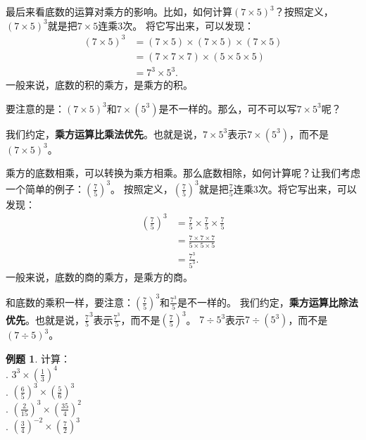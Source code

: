 \documentclass[12pt,UTF8]{ctexbook}
\theoremstyle{definition}
\newtheorem{et}{例题}[section]
\theoremstyle{plain}
\begin{document}
最后来看底数的运算对乘方的影响。比如，如何计算$(7\times 5)^3$？按照定义，$(7\times 5)^3$就是把$7\times 5$连乘$3$次。
将它写出来，可以发现：
\begin{align*}
    (7\times 5)^3 &= (7\times 5) \times (7\times 5) \times (7\times 5) \\
    &= (7 \times 7 \times 7) \times (5 \times 5 \times 5) \\
    &= 7^3 \times 5^3.
\end{align*}
一般来说，底数的积的乘方，是乘方的积。

要注意的是：$(7\times 5)^3$和$7\times (5^3)$是不一样的。那么，可不可以写$7\times 5^3$呢？

我们约定，\textbf{乘方运算比乘法优先}。也就是说，$7\times 5^3$表示$7\times (5^3)$，而不是$(7\times 5)^3$。

乘方的底数相乘，可以转换为乘方相乘。那么底数相除，如何计算呢？让我们考虑一个简单的例子：$\left(\frac{7}{5}\right)^3$。
按照定义，$\left(\frac{7}{5}\right)^3$就是把$\frac{7}{5}$连乘$3$次。将它写出来，可以发现：
\begin{align*}
    \left(\frac{7}{5}\right)^3 &= \frac{7}{5} \times \frac{7}{5} \times \frac{7}{5} \\
    &= \frac{7\times 7\times 7}{5\times 5\times 5} \\
    &= \frac{7^3}{5^3}.
\end{align*}
一般来说，底数的商的乘方，是乘方的商。

和底数的乘积一样，要注意：$\left(\frac{7}{5}\right)^3$和$\frac{7^3}{5}$是不一样的。
我们约定，\textbf{乘方运算比除法优先}。也就是说，$\frac{7}{5}^3$表示$\frac{7^3}{5}$，而不是$\left(\frac{7}{5}\right)^3$。
$7\div 5^3$表示$7\div (5^3)$，而不是$(7\div 5)^3$。

\begin{et}
    计算：\\
    . $3^3 \times \left(\frac{1}{3}\right)^4$  \\
    . $\left(\frac{6}{5}\right)^3\times \left(\frac{5}{6}\right)^3$ \\
    . $\left(\frac{2}{15}\right)^3\times \left(\frac{35}{4}\right)^2$ \\
    . $\left(\frac{3}{4}\right)^{-2}\times \left(\frac{7}{2}\right)^3$ 
\end{et}
\end{document}

